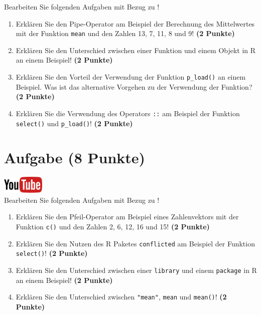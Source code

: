 \documentclass[a4paper, 10pt]{scrartcl}\usepackage[]{graphicx}\usepackage[]{xcolor}
\begin{document}
Bearbeiten Sie folgenden Aufgaben mit Bezug zu \Rlogo! 

\begin{enumerate}
\item Erkl{\"a}ren Sie den Pipe-Operator am Beispiel der Berechnung des Mittelwertes
mit der Funktion \texttt{mean} und den Zahlen 13, 7, 11, 8 und 9!  \textbf{(2 Punkte)} 
\item Erkl{\"a}ren Sie den Unterschied zwischen einer Funktion und einem Objekt
  in R an einem Beispiel! \textbf{(2 Punkte)} 
\item Erkl{\"a}ren Sie den Vorteil der Verwendung der Funktion \texttt{p\_load()} an
einem Beispiel. Was ist das alternative Vorgehen zu der Verwendung der
Funktion? \textbf{(2 Punkte)} 
\item Erkl{\"a}ren Sie die Verwendung des Operators \texttt{::} am Beispiel der
Funktion \texttt{select()} und \texttt{p\_load()}! \textbf{(2 Punkte)} 
\end{enumerate}


 
\clearpage

\section{Aufgabe \hfill (8 Punkte)}

\hfill\href{https://youtu.be/xP9xjcLIbDE}{\includegraphics[width =
  2cm]{img/youtube}}\\[1Ex]




Bearbeiten Sie folgenden Aufgaben mit Bezug zu \Rlogo! 

\begin{enumerate}
  \item Erkl{\"a}ren Sie den Pfeil-Operator am Beispiel eines Zahlenvektors mit der
Funktion \texttt{c()} und den Zahlen 2, 6, 12, 16 und 15! \textbf{(2 Punkte)}
\item Erkl{\"a}ren Sie den Nutzen des R Paketes \texttt{conflicted} am Beispiel der
  Funktion \texttt{select()}! \textbf{(2 Punkte)} 
\item Erkl{\"a}ren Sie den Unterschied zwischen einer \texttt{library} und
  einem \texttt{package} in R an einem Beispiel! \textbf{(2 Punkte)} 
\item Erkl{\"a}ren Sie den Unterschied zwischen \texttt{"mean"}, \texttt{mean}
  und \texttt{mean()}! \textbf{(2 Punkte)} 
\end{enumerate}
\end{document}
